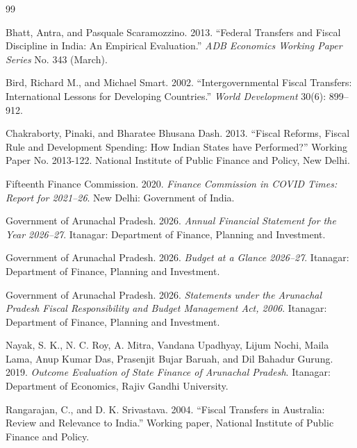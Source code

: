 \documentclass[11pt,a4paper]{article}
\begin{document}
\begin{thebibliography}{99}

Bhatt, Antra, and Pasquale Scaramozzino. 2013. ``Federal Transfers and Fiscal Discipline in India: An Empirical Evaluation.'' \emph{ADB Economics Working Paper Series} No. 343 (March).

Bird, Richard M., and Michael Smart. 2002. ``Intergovernmental Fiscal Transfers: International Lessons for Developing Countries.'' \emph{World Development} 30(6): 899--912.

Chakraborty, Pinaki, and Bharatee Bhusana Dash. 2013. ``Fiscal Reforms, Fiscal Rule and Development Spending: How Indian States have Performed?'' Working Paper No. 2013-122. National Institute of Public Finance and Policy, New Delhi.

Fifteenth Finance Commission. 2020. \emph{Finance Commission in COVID Times: Report for 2021--26}. New Delhi: Government of India.

Government of Arunachal Pradesh. 2026. \emph{Annual Financial Statement for the Year 2026--27}. Itanagar: Department of Finance, Planning and Investment.

Government of Arunachal Pradesh. 2026. \emph{Budget at a Glance 2026--27}. Itanagar: Department of Finance, Planning and Investment.

Government of Arunachal Pradesh. 2026. \emph{Statements under the Arunachal Pradesh Fiscal Responsibility and Budget Management Act, 2006}. Itanagar: Department of Finance, Planning and Investment.

Nayak, S. K., N. C. Roy, A. Mitra, Vandana Upadhyay, Lijum Nochi, Maila Lama, Anup Kumar Das, Prasenjit Bujar Baruah, and Dil Bahadur Gurung. 2019. \emph{Outcome Evaluation of State Finance of Arunachal Pradesh}. Itanagar: Department of Economics, Rajiv Gandhi University.

Rangarajan, C., and D. K. Srivastava. 2004. ``Fiscal Transfers in Australia: Review and Relevance to India.'' Working paper, National Institute of Public Finance and Policy.


\end{thebibliography}
\end{document}

